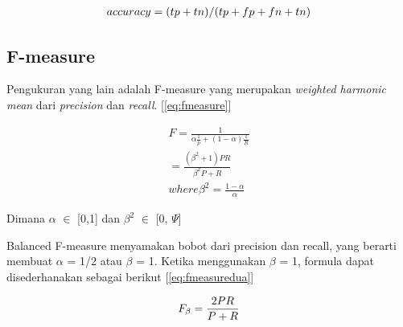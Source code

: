 \begin{equation}
\begin{split}
\tiny
accuracy = (tp+tn)/(tp+fp+fn+tn)
\label{eq:akurasi}
\normalsize
\end{split}
\end{equation}

\subsection*{F-measure}
Pengukuran yang lain adalah F-measure yang merupakan \textit{weighted harmonic mean} dari \textit{precision} dan \textit{recall}. [\ref{eq:fmeasure}]

\begin{equation}
\begin{split}
F = \frac{1}{\alpha \frac{1}{p} + (1 - \alpha)\frac{1}{R}} \\
= \frac{(\beta^2 + 1)PR}{\beta^2P + R} \\
where \beta^2 = \frac{1 - \alpha}{\alpha}
\label{eq:fmeasure}
\end{split}
\end{equation}

Dimana $\alpha$ $\in$ [0,1] dan $\beta^2$ $\in$ [0, $\Psi$]

Balanced F-measure menyamakan bobot dari precision dan recall, yang berarti membuat $\alpha$ = 1/2 atau $\beta$ = 1. Ketika menggunakan $\beta$ = 1, formula dapat disederhanakan sebagai berikut  [\ref{eq:fmeasuredua}]

\begin{equation}
\begin{split}
\tiny
F_\beta = \frac{2PR}{P + R}
\label{eq:fmeasuredua}
\normalsize
\end{split}
\end{equation}
